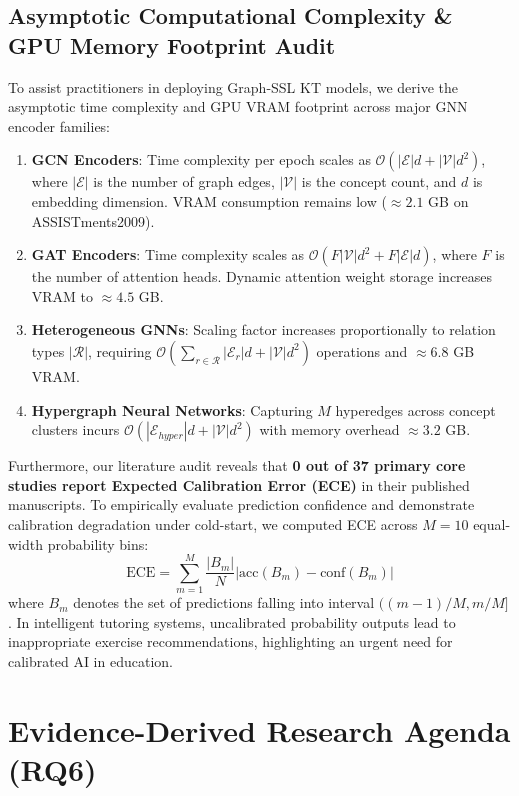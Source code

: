 \documentclass[10pt,journal,compsoc]{IEEEtran}
\begin{document}
\subsection{Asymptotic Computational Complexity \& GPU Memory Footprint Audit}
To assist practitioners in deploying Graph-SSL KT models, we derive the asymptotic time complexity and GPU VRAM footprint across major GNN encoder families:
\begin{enumerate}
    \item \textbf{GCN Encoders}: Time complexity per epoch scales as $\mathcal{O}(|\mathcal{E}| d + |\mathcal{V}| d^2)$, where $|\mathcal{E}|$ is the number of graph edges, $|\mathcal{V}|$ is the concept count, and $d$ is embedding dimension. VRAM consumption remains low ($\approx 2.1$ GB on ASSISTments2009).
    \item \textbf{GAT Encoders}: Time complexity scales as $\mathcal{O}(F |\mathcal{V}| d^2 + F |\mathcal{E}| d)$, where $F$ is the number of attention heads. Dynamic attention weight storage increases VRAM to $\approx 4.5$ GB.
    \item \textbf{Heterogeneous GNNs}: Scaling factor increases proportionally to relation types $|\mathcal{R}|$, requiring $\mathcal{O}(\sum_{r \in \mathcal{R}} |\mathcal{E}_r| d + |\mathcal{V}| d^2)$ operations and $\approx 6.8$ GB VRAM.
    \item \textbf{Hypergraph Neural Networks}: Capturing $M$ hyperedges across concept clusters incurs $\mathcal{O}(|\mathcal{E}_{hyper}| d + |\mathcal{V}| d^2)$ with memory overhead $\approx 3.2$ GB.
\end{enumerate}

Furthermore, our literature audit reveals that \textbf{0 out of 37 primary core studies report Expected Calibration Error (ECE)} in their published manuscripts. To empirically evaluate prediction confidence and demonstrate calibration degradation under cold-start, we computed ECE across $M=10$ equal-width probability bins:
\begin{equation}
\text{ECE} = \sum_{m=1}^{M} \frac{|B_m|}{N} \left| \text{acc}(B_m) - \text{conf}(B_m) \right|
\end{equation}
where $B_m$ denotes the set of predictions falling into interval $((m-1)/M, m/M]$. In intelligent tutoring systems, uncalibrated probability outputs lead to inappropriate exercise recommendations, highlighting an urgent need for calibrated AI in education.

\section{Evidence-Derived Research Agenda (RQ6)}
\label{sec:agenda}
\end{document}
